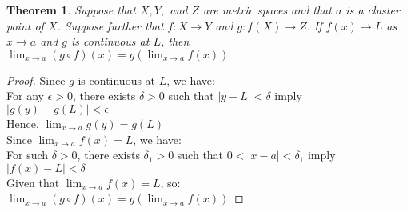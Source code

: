 \documentclass[12pt, reqno]{amsart}
\newtheorem{theorem}{Theorem}[section]
\theoremstyle{definition}
\numberwithin{equation}{section}
\begin{document}
\begin{theorem}\cite{s1}
    Suppose that $X,Y,$ and $Z$ are metric spaces and that $a$ is a cluster point of $X$. Suppose further that $f:X \rightarrow Y$ and $g:f(X) \rightarrow Z$. If $f(x) \rightarrow L$ as $x \rightarrow a$ and $g$ is continuous at $L$, then\\
    \hspace*{5cm}  $\lim_{x \to a} (g \circ f)(x) = g(\lim_{x \to a}f(x))$
\end{theorem}
\begin{proof}
Since $g$ is continuous at $L$, we have:\\
For any $\epsilon>0$, there exists $\delta>0$ such that $|y-L| < \delta$ imply\\
\hspace*{5cm} $|g(y)-g(L)|<\epsilon$\\
Hence, $\lim_{x \rightarrow a}g(y)=g(L)$\\
Since $\lim_{x \rightarrow a} f(x) =L$, we have:\\
For such $\delta >0$, there exists $\delta_1 >0$ such that $0<|x-a|<\delta_1$ imply\\
\hspace*{5cm} $|f(x)-L| < \delta$\\
Given that $\lim_{x \rightarrow a} f(x) =L$, so:\\
\hspace*{5cm} $\lim_{x \rightarrow a} (g \circ f)(x) = g(\lim_{x \rightarrow a} f(x))$
\end{proof}
\end{document}
